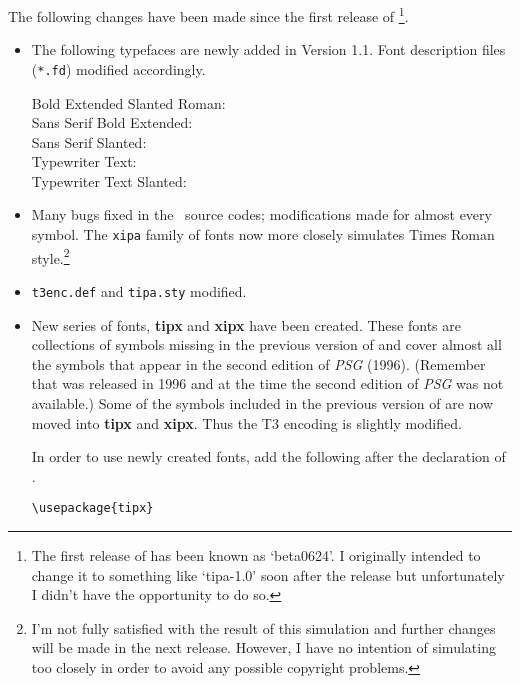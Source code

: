 The following changes have been made since the first release of
\tipa\footnote{The first release of \tipa{} has been known as
  `beta0624'. I originally intended to change it to
  something like `tipa-1.0' soon after the release but unfortunately
  I didn't have the opportunity to do so.}.

\begin{itemize}
\item The following typefaces are newly added in Version
  1.1. Font description files (\texttt{*.fd}) modified accordingly.

  Bold Extended Slanted Roman: \textbf{}\\
  Sans Serif Bold Extended: \textbf{\textsf{}}\\
  Sans Serif Slanted:  \textsf{}\\
  Typewriter Text: \texttt{}\\
  Typewriter Text Slanted: \textsl{\texttt{}}

\item Many bugs fixed in the \MF\ source codes; modifications made for
  almost every symbol. The \texttt{xipa} family of fonts now more closely
  simulates Times Roman style.\footnote{%
    I'm not fully satisfied with the result of this simulation and
    further changes will be made in the next release. However, I have
    no intention of simulating too closely in order to avoid any
    possible copyright problems.}

\item \texttt{t3enc.def} and \texttt{tipa.sty} modified.

\item New series of fonts, \textbf{tipx} and \textbf{xipx} have been
  created. These fonts are collections of symbols missing in the
  previous version of \tipa{} and cover almost all the symbols that
  appear in the second edition of \emph{PSG} (1996). (Remember that
  \tipa{} was released in 1996 and at the time the second edition of
  \emph{PSG} was not available.) Some of the symbols included in the
  previous version of \tipa{} are now moved into \textbf{tipx} and
  \textbf{xipx}. Thus the T3 encoding is slightly modified.

  In order to use newly created fonts, add the following after the
  declaration of \tipa{}.

  \verb|\usepackage{tipx}|


\end{itemize}
